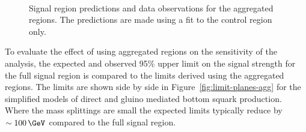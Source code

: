 \begin{figure}[!tbhp]
\begin{center}
     \\
  \end{center}
    \caption{ Signal region predictions and data observations for the aggregated regions. 
    The predictions are made using a fit to the control region only. \label{fig:aggFitResult} }
\end{figure}

To evaluate the effect of using aggregated regions on the sensitivity of the \alphat analysis, 
the expected and observed 95\% upper limit on the signal strength for the full signal region 
is compared to the limits derived using the aggregated regions. The limits are shown side by side
in Figure~\ref{fig:limit-planes-agg} for the simplified models of direct and 
gluino mediated bottom squark production. Where the mass
splittings are small the expected limits typically reduce by $\sim100\,\GeV$ 
compared to the full signal region.

